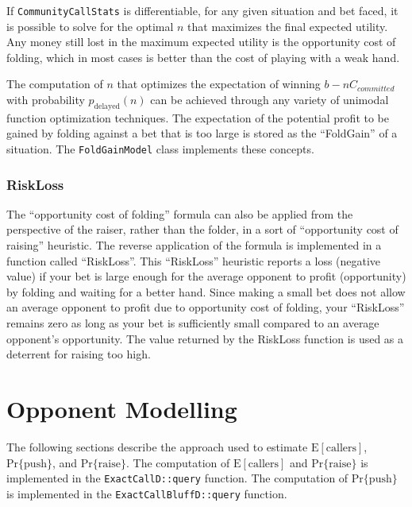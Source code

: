 If \texttt{CommunityCallStats} is differentiable, for any given situation and bet faced, it is possible to solve for the optimal $n$ that maximizes the final expected utility.
Any money still lost in the maximum expected utility is the opportunity cost of folding, which in most cases is better than the cost of playing with a weak hand.

The computation of $n$ that optimizes the expectation of winning $b-n C_{committed}$ with probability $p_{\mathrm{delayed}}(n)$ can be achieved through any variety of unimodal function optimization techniques.
The expectation of the potential profit to be gained by folding against a bet that is too large is stored as the ``FoldGain'' of a situation.
The \texttt{FoldGainModel} class implements these concepts.

\subsubsection{RiskLoss}
\label{sec:RiskLoss}
The ``opportunity cost of folding'' formula can also be applied from the perspective of the raiser, rather than the folder, in a sort of ``opportunity cost of raising'' heuristic.
The reverse application of the formula is implemented in a function called ``RiskLoss''.
This ``RiskLoss'' heuristic reports a loss (negative value) if your bet is large enough for the average opponent to profit (opportunity) by folding and waiting for a better hand.
Since making a small bet does not allow an average opponent to profit due to opportunity cost of folding, your ``RiskLoss'' remains zero as long as your bet is sufficiently small compared to an average opponent's opportunity.
The value returned by the RiskLoss function is used as a deterrent for raising too high.


\section{Opponent Modelling}

The following sections describe the approach used to estimate $\mathrm{E[callers]}$, $\mathrm{Pr\{push\}}$, and $\mathrm{Pr\{raise\}}$.
The computation of $\mathrm{E[callers]}$ and $\mathrm{Pr\{raise\}}$ is implemented in the \texttt{ExactCallD::query} function.
The computation of $\mathrm{Pr\{push\}}$ is implemented in the \texttt{ExactCallBluffD::query} function.


